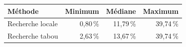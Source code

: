 \begin{tabular}{lrrr}
\toprule
Méthode & Minimum & Médiane & Maximum \\
\midrule
Recherche locale & 0{,}80\,\% & 11{,}79\,\% & 39{,}74\,\% \\
Recherche tabou & 2{,}63\,\% & 13{,}67\,\% & 39{,}74\,\% \\
\bottomrule
\end{tabular}
